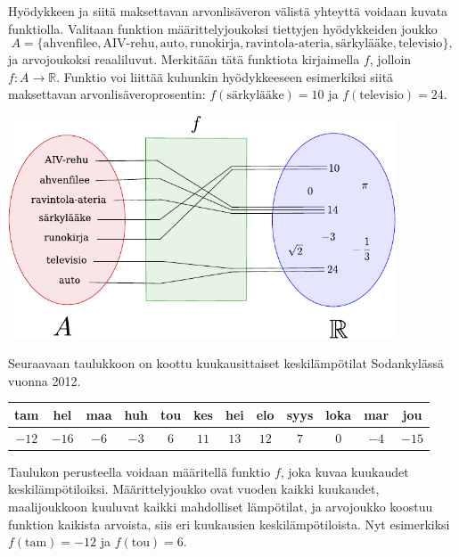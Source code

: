 \begin{esimerkki}
	Hyödykkeen ja siitä maksettavan arvonlisäveron välistä yhteyttä voidaan kuvata funktiolla. Valitaan funktion määrittelyjoukoksi tiettyjen hyödykkeiden joukko
		\[ A = \{\text{ahvenfilee}, \text{AIV-rehu}, \text{auto}, \text{runokirja},
		\text{ravintola-ateria}, \text{särkylääke}, \text{televisio}\}, \]
	ja arvojoukoksi reaaliluvut. Merkitään tätä funktiota kirjaimella $f$, jolloin
	$f\colon A \to \mathbb{R}$.
	Funktio voi liittää kuhunkin hyödykkeeseen esimerkiksi siitä maksettavan arvonlisäveroprosentin:
	$f(\text{särkylääke}) = 10$ ja $f(\text{televisio}) = 24$.

	\begin{center}
		\includegraphics[width=11.5cm]{pictures/funktiokone.pdf}
	\end{center}
\end{esimerkki}

\begin{esimerkki}
Seuraavaan taulukkoon on koottu kuukausittaiset keskilämpötilat Sodankylässä vuonna 2012.

	\begin{tabular}{|c|c|c|c|c|c|c|c|c|c|c|c|}
	\hline
	tam & hel & maa & huh & tou & kes & hei & elo & syys & loka & mar & jou\\
	\hline
	$-12$ & $-16$ & $-6$ & $-3$ & $6$ & $11$ & $13$ & $12$ & $7$ & $0$ & $-4$ & $-15$\\
	\hline
	\end{tabular}

Taulukon perusteella voidaan määritellä funktio $f$, joka kuvaa kuukaudet keskilämpötiloiksi. Määrittelyjoukko ovat vuoden kaikki kuukaudet, maalijoukkoon kuuluvat kaikki mahdolliset lämpötilat, ja arvojoukko koostuu funktion kaikista arvoista, siis eri kuukausien keskilämpötiloista. Nyt esimerkiksi $f(\text{tam}) = -12$ ja $f(\text{tou}) = 6$.

\end{esimerkki}

